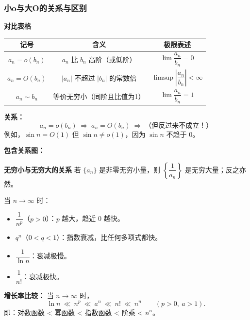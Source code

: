 \documentclass[fontset=fandol]{ctexart}
\newenvironment{custom}[1]{\par\noindent\textbf{#1}\quad}{\par\vspace{0.8em}}
\begin{document}
\subsubsection{小o与大O的关系与区别}

\begin{custom}{对比表格}
\begin{tabular}{|c|c|c|}
\hline
\textbf{记号} & \textbf{含义} & \textbf{极限表述} \\
\hline
\(a_n = o(b_n)\) & \(a_n\) 比 \(b_n\) 高阶（或低阶） & \(\lim \dfrac{a_n}{b_n} = 0\) \\
\hline
\(a_n = O(b_n)\) & \(|a_n|\) 不超过 \(|b_n|\) 的常数倍 & \(\limsup \left|\dfrac{a_n}{b_n}\right| < \infty\) \\
\hline
\(a_n \sim b_n\) & 等价无穷小（同阶且比值为1） & \(\lim \dfrac{a_n}{b_n} = 1\) \\
\hline
\end{tabular}

\textbf{关系：}
\[
a_n = o(b_n) \;\Rightarrow\; a_n = O(b_n) \;\Rightarrow\; \text{（但反过来不成立！）}
\]
例如，\(\sin n = O(1)\) 但 \(\sin n \neq o(1)\)，因为 \(\sin n\) 不趋于 0。

\textbf{包含关系图：}
\begin{center}
\end{center}
\end{custom}

\begin{custom}{无穷小与无穷大的关系}
若 \(\{a_n\}\) 是非零无穷小量，则 \(\left\{\dfrac{1}{a_n}\right\}\) 是无穷大量；反之亦然。
\end{custom}

\begin{example}[常见无穷小量的比较]
当 \(n \to \infty\) 时：
\begin{itemize}
\item \(\dfrac{1}{n^p}\)（\(p>0\)）：\(p\) 越大，趋近 0 越快。
\item \(q^n\)（\(0 < q < 1\)）：指数衰减，比任何多项式都快。
\item \(\dfrac{1}{\ln n}\)：衰减极慢。
\item \(\dfrac{1}{n!}\)：衰减极快。
\end{itemize}

\textbf{增长率比较：} 当 \(n \to \infty\) 时，
\[
\ln n \ \ll\ n^p \ \ll\ a^n \ \ll\ n! \ \ll\ n^n \qquad (p>0,\ a>1).
\]
即：对数函数 < 幂函数 < 指数函数 < 阶乘 < \(n^n\)。
\end{example}
\end{document}
